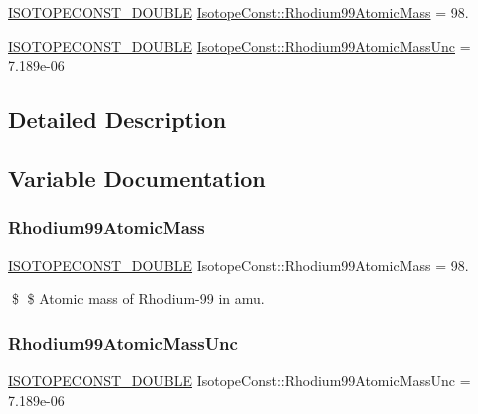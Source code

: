 \begin{DoxyCompactItemize}
\item 
\mbox{\hyperlink{group___isotope_const-_macros_ga8f45a7272ce02c0b4c65c44636ed719a}{I\+S\+O\+T\+O\+P\+E\+C\+O\+N\+S\+T\+\_\+\+D\+O\+U\+B\+LE}} \mbox{\hyperlink{group___isotope_const-_rhodium-_rh99_ga20b382e482853f0d49ac27acd19eb916}{Isotope\+Const\+::\+Rhodium99\+Atomic\+Mass}} = 98.
\item 
\mbox{\hyperlink{group___isotope_const-_macros_ga8f45a7272ce02c0b4c65c44636ed719a}{I\+S\+O\+T\+O\+P\+E\+C\+O\+N\+S\+T\+\_\+\+D\+O\+U\+B\+LE}} \mbox{\hyperlink{group___isotope_const-_rhodium-_rh99_ga5e771bd8f9a7be55a10761f86f14ea13}{Isotope\+Const\+::\+Rhodium99\+Atomic\+Mass\+Unc}} = 7.\+189e-\/06
\end{DoxyCompactItemize}


\subsection{Detailed Description}


\subsection{Variable Documentation}
\mbox{\label{group___isotope_const-_rhodium-_rh99_ga20b382e482853f0d49ac27acd19eb916}} 
\subsubsection{\texorpdfstring{Rhodium99\+Atomic\+Mass}{Rhodium99AtomicMass}}
{\footnotesize\ttfamily \mbox{\hyperlink{group___isotope_const-_macros_ga8f45a7272ce02c0b4c65c44636ed719a}{I\+S\+O\+T\+O\+P\+E\+C\+O\+N\+S\+T\+\_\+\+D\+O\+U\+B\+LE}} Isotope\+Const\+::\+Rhodium99\+Atomic\+Mass = 98.}

\$ \$ Atomic mass of Rhodium-\/99 in amu. \mbox{\label{group___isotope_const-_rhodium-_rh99_ga5e771bd8f9a7be55a10761f86f14ea13}} 
\subsubsection{\texorpdfstring{Rhodium99\+Atomic\+Mass\+Unc}{Rhodium99AtomicMassUnc}}
{\footnotesize\ttfamily \mbox{\hyperlink{group___isotope_const-_macros_ga8f45a7272ce02c0b4c65c44636ed719a}{I\+S\+O\+T\+O\+P\+E\+C\+O\+N\+S\+T\+\_\+\+D\+O\+U\+B\+LE}} Isotope\+Const\+::\+Rhodium99\+Atomic\+Mass\+Unc = 7.\+189e-\/06}

